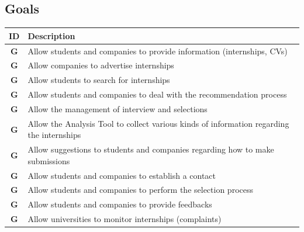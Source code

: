 \subsection{Goals}\label{subsec:goals}
\renewcommand{\arraystretch}{1.5} %
\setcounter{g}{1}
\newcommand{\cg}{\theg\stepcounter{g}}
\begin{center}
    \begin{longtable}{|c|p{}|}
        \hline
        \rowcolor[HTML]{E7E0FA}
        \textbf{ID} & \textbf{Description} \\ \hline
        \rowcolor[HTML]{FFFFFF}
        \textbf{G\cg} & Allow students and companies to provide information (internships, CVs) \\ \hline
        \rowcolor[HTML]{F0F0F0}
        \textbf{G\cg} & Allow companies to advertise internships \\ \hline
        \rowcolor[HTML]{FFFFFF}
        \textbf{G\cg} & Allow students to search for internships \\ \hline
        \rowcolor[HTML]{F0F0F0}
        \textbf{G\cg} & Allow students and companies to deal with the recommendation process\\ \hline
        \rowcolor[HTML]{FFFFFF}
        \textbf{G\cg} & Allow the management of interview and selections \\ \hline
        \rowcolor[HTML]{F0F0F0}
        \textbf{G\cg} & Allow the Analysis Tool to collect various kinds of information regarding the internships \\ \hline
        \rowcolor[HTML]{FFFFFF}
        \textbf{G\cg} & Allow suggestions to students and companies regarding how to make submissions \\ \hline
        \rowcolor[HTML]{F0F0F0}
        \textbf{G\cg} & Allow students and companies to establish a contact \\ \hline
        \rowcolor[HTML]{FFFFFF}
        \textbf{G\cg} & Allow students and companies to perform the selection process \\ \hline
        \rowcolor[HTML]{F0F0F0}
        \textbf{G\cg} & Allow students and companies to provide feedbacks \\ \hline
        \rowcolor[HTML]{FFFFFF}
        \textbf{G\cg} & Allow universities to monitor internships (complaints) \\ \hline
    \end{longtable}
\end{center}


